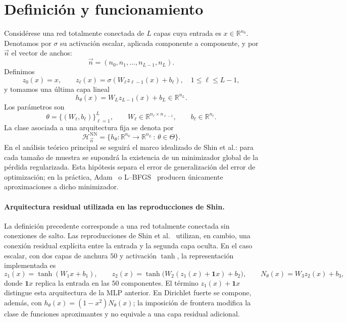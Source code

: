 \section{Definición y funcionamiento}

Considérese una red totalmente conectada de $L$ capas cuya entrada es
$x\in\mathbb{R}^{n_0}$. Denotamos por $\sigma$ su activación escalar,
aplicada componente a componente, y por $\vec n$ el vector de anchos:
\[
\vec n=(n_0,n_1,\dots,n_{L-1},n_L).
\]
Definimos
\[
z_0(x)=x,
\qquad
z_\ell(x)=\sigma\!\left(W_\ell z_{\ell-1}(x)+b_\ell\right),
\quad 1\leq \ell\leq L-1,
\]
y tomamos una última capa lineal
\[
h_\theta(x)=W_L z_{L-1}(x)+b_L\in\mathbb{R}^{n_L}.
\]
Los parámetros son
\[
\theta=\{(W_\ell,b_\ell)\}_{\ell=1}^{L},
\qquad
W_\ell\in\mathbb{R}^{n_\ell\times n_{\ell-1}},
\qquad
b_\ell\in\mathbb{R}^{n_\ell}.
\]
La clase asociada a una arquitectura fija se denota por
\[
\mathcal{H}^{\mathrm{NN}}_{\vec n}
=
\{h_\theta:\mathbb{R}^{n_0}\to\mathbb{R}^{n_L}\,:\,\theta\in\Theta\}.
\]
En el análisis teórico principal se seguirá el marco idealizado de Shin et al.: para cada tamaño de muestra se supondrá la existencia de un minimizador global de la pérdida regularizada. Esta hipótesis separa el error de generalización del error de optimización; en la práctica, Adam~\cite{adam2015method} o L--BFGS~\cite{liunocedal1989lbfgs} producen únicamente aproximaciones a dicho minimizador.



\paragraph{Arquitectura residual utilizada en las reproducciones de Shin.}
La definición precedente corresponde a una red totalmente conectada sin conexiones de salto. Las reproducciones de Shin et al.~\cite{shin2020convergence} utilizan, en cambio, una conexión residual explícita entre la entrada y la segunda capa oculta. En el caso escalar, con dos capas de anchura $50$ y activación $\tanh$, la representación implementada es
\[
 z_1(x)=\tanh(W_1x+b_1),\qquad
 z_2(x)=\tanh\!\bigl(W_2(z_1(x)+\mathbf{1}x)+b_2\bigr),\qquad
 N_\theta(x)=W_3z_2(x)+b_3,
\]
donde $\mathbf{1}x$ replica la entrada en las $50$ componentes. El término $z_1(x)+\mathbf{1}x$ distingue esta arquitectura de la MLP anterior. En Dirichlet fuerte se compone, además, con $h_\theta(x)=(1-x^2)N_\theta(x)$; la imposición de frontera modifica la clase de funciones aproximantes y no equivale a una capa residual adicional.

